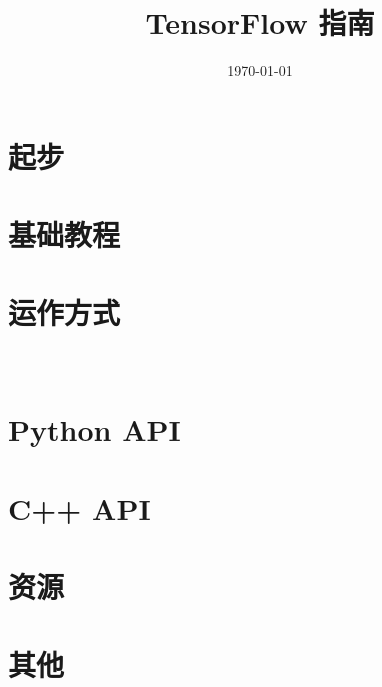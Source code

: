 \documentclass[a4paper,11pt,twoside]{ctexbook}
\title{TensorFlow 指南}
\author{}
\date{\today}
\begin{document}
\maketitle
\tableofcontents

\newpage
\chapter{起步}




\newpage
\chapter{基础教程}












\newpage
\chapter{运作方式}











🍁 %
\newpage
\chapter{Python API}















\newpage
\chapter{C++ API}

\newpage
\chapter{资源}

\newpage
\chapter{其他}

\printindex
{}
\end{document}
